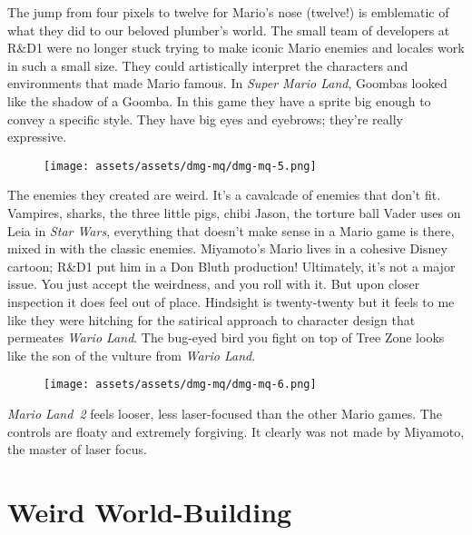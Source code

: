 \documentclass{book}
\begin{document}
The jump from four pixels to twelve for Mario’s nose (twelve!) is emblematic of what they did to our beloved plumber’s world. The small team of developers at R\&D1 were no longer stuck trying to make iconic Mario enemies and locales work in such a small size. They could artistically interpret the characters and environments that made Mario famous. In \emph{Super Mario Land}, Goombas looked like the shadow of a Goomba. In this game they have a sprite big enough to convey a specific style. They have big eyes and eyebrows; they’re really expressive.

\begin{figure}[hbt]
\vskip 10pt
\centering \texttt{[image: assets/assets/dmg-mq/dmg-mq-5.png]}
\vskip 6pt
\end{figure}

The enemies they created are weird. It’s a cavalcade of enemies that don’t fit. Vampires, sharks, the three little pigs, chibi Jason, the torture ball Vader uses on Leia in \emph{Star Wars}, everything that doesn’t make sense in a Mario game is there, mixed in with the classic enemies. Miyamoto’s Mario lives in a cohesive Disney cartoon; R\&D1 put him in a Don Bluth production! Ultimately, it’s not a major issue. You just accept the weirdness, and you roll with it. But upon closer inspection it does feel out of place. Hindsight is twenty-twenty but it feels to me like they were hitching for the satirical approach to character design that permeates \emph{Wario Land}. The bug-eyed bird you fight on top of Tree Zone looks like the son of the vulture from \emph{Wario Land}.

\begin{figure}[hbt]
\vskip 10pt
\centering \texttt{[image: assets/assets/dmg-mq/dmg-mq-6.png]}
\vskip 6pt
\end{figure}

\emph{Mario Land 2} feels looser, less laser-focused than the other Mario games. The controls are floaty and extremely forgiving. It clearly was not made by Miyamoto, the master of laser focus.

\FloatBarrier\needspace{10mm}\section*{Weird World-Building}\nopagebreak[4]
\end{document}
